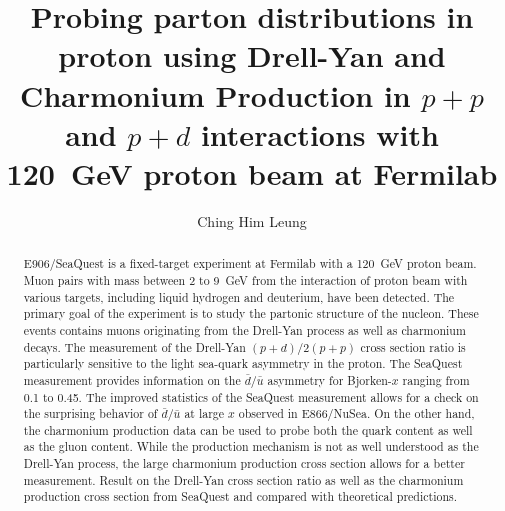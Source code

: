 \documentclass[]{uiucthesis2021}
\begin{document}
\title{Probing parton distributions in proton using Drell-Yan and Charmonium Production
	in \texorpdfstring{$p+p$}{p+p} and \texorpdfstring{$p+d$}{p+d} interactions with
	\texorpdfstring{\SI{120}{\GeV}}{120~GeV} proton beam at Fermilab}
\author{Ching Him Leung}

\phdthesis
{}
\maketitle
\frontmatter

\begin{abstract}
	E906/SeaQuest is a fixed-target experiment at Fermilab with a \SI{120}{\GeV}
	proton beam. Muon pairs with mass between \num{2} to \SI{9}{\GeV} from the
	interaction of proton beam with various targets, including liquid hydrogen and
	deuterium, have been detected.
	The primary goal of the experiment is to study the partonic structure of the nucleon.
	These events contains muons originating from the Drell-Yan process as well as
	charmonium decays. The measurement of the Drell-Yan $(p+d)/2(p+p)$ cross section
	ratio is particularly sensitive to the light sea-quark asymmetry in the proton.
	The SeaQuest measurement provides information on the $\bar{d}/\bar{u}$ asymmetry
	for  Bjorken-$x$ ranging from \num{0.1} to \num{0.45}. The improved statistics
	of the SeaQuest measurement allows for a check on the surprising behavior of
	$\bar{d}/\bar{u}$ at large $x$ observed in E866/NuSea.
	On the other hand, the charmonium production data can be used to probe both the quark
	content as well as the gluon content. While the production mechanism is not as well
	understood as the Drell-Yan process, the large charmonium production cross section
	allows for a better measurement.
	Result on the Drell-Yan cross section ratio	as well as the charmonium production cross
	section from SeaQuest and compared with theoretical predictions.

\end{abstract}


\ifoptionfinal{
	
}{}

{
	\hypersetup{linkcolor=black}  %
	\tableofcontents
	\listoffigures
}
\end{document}
